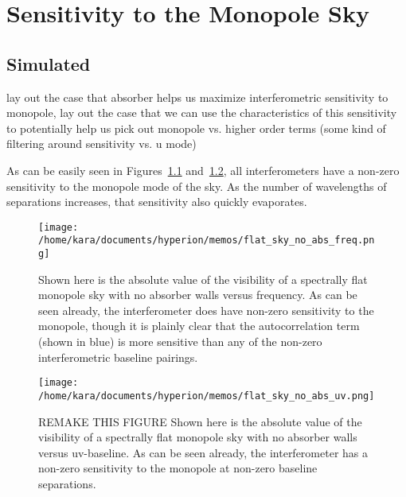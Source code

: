 \chapter{Sensitivity to the Monopole Sky}

\section{Simulated}

lay out the case that absorber helps us maximize interferometric sensitivity to 
monopole, lay out the case that we can use the characteristics of this 
sensitivity to potentially help us pick out monopole vs. higher order terms 
(some kind of filtering around sensitivity vs. u mode)

As can be easily seen in Figures~\ref{fig:flat-sky-no-abs-freq} 
and~\ref{fig:flat-sky-no-abs-uv}, all interferometers have a non-zero 
sensitivity to the monopole mode of the sky. As the number of wavelengths of 
separations increases, that sensitivity also quickly evaporates.

\begin{figure}
    \begin{center}
    \texttt{[image: /home/kara/documents/hyperion/memos/flat\_sky\_no\_abs\_freq.png]}
    \end{center}
    \caption{
        Shown here is the absolute value of the visibility of a spectrally flat 
        monopole sky with no absorber walls versus frequency. As can be seen 
        already, the interferometer does have non-zero sensitivity to the 
        monopole, though it is plainly clear that the autocorrelation term 
        (shown in blue) is more sensitive than any of the non-zero 
        interferometric baseline pairings.
    }
    \label{fig:flat-sky-no-abs-freq}
\end{figure}

\begin{figure}
    \begin{center}
    \texttt{[image: /home/kara/documents/hyperion/memos/flat\_sky\_no\_abs\_uv.png]}
    \end{center}
    \caption{
        REMAKE THIS FIGURE
        Shown here is the absolute value of the visibility of a spectrally flat 
        monopole sky with no absorber walls versus uv-baseline. As can be seen 
        already, the interferometer has a non-zero sensitivity to the monopole 
        at non-zero baseline separations.
    }
    \label{fig:flat-sky-no-abs-uv}
\end{figure}

